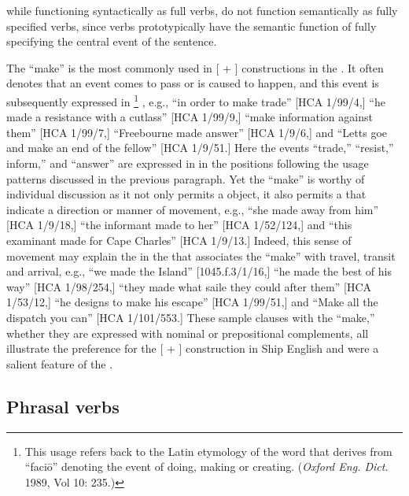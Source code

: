 while functioning syntactically as full verbs, do not function semantically as fully specified verbs, since verbs prototypically have the semantic function of fully specifying the central event of the sentence. 

The  “make” is the most commonly used  in [ + ] constructions in the . It often denotes that an event comes to pass or is caused to happen, and this event is subsequently expressed in \footnote{This usage refers back to the Latin etymology of the word that derives from “{faciō}” denoting the event of doing, making or creating. (\textit{Oxford Eng. Dict.} 1989, Vol 10: 235.)} , e.g., “in order to make trade” [HCA 1/99/4,] “he made a resistance with a cutlass” [HCA 1/99/9,] “make information against them” [HCA 1/99/7,] “Freebourne made answer” [HCA 1/9/6,] and “Letts goe and make an end of the fellow” [HCA 1/9/51.] Here the events “trade,” “resist,” inform,” and “answer” are expressed in  in the  positions following the usage patterns discussed in the previous paragraph. Yet the  “make” is worthy of individual discussion as it not only permits a  object, it also permits a  that indicate a direction or manner of movement, e.g., “she made away from him” [HCA 1/9/18,] “the informant made to her” [HCA 1/52/124,] and “this examinant made for Cape Charles” [HCA 1/9/13.] Indeed, this sense of movement may explain the  in the  that associates the  “make” with travel, transit and arrival, e.g., “we made the Island” [1045.f.3/1/16,] “he made the best of his way” [HCA 1/98/254,] “they made what saile they could after them” [HCA 1/53/12,] “he designs to make his escape” [HCA 1/99/51,] and “Make all the dispatch you can” [HCA 1/101/553.] These sample clauses with the  “make,” whether they are expressed with nominal or prepositional complements, all illustrate the preference for the [ + ] construction in Ship English and were a salient feature of the . 

\subsection{{Phrasal} {verbs}}%

